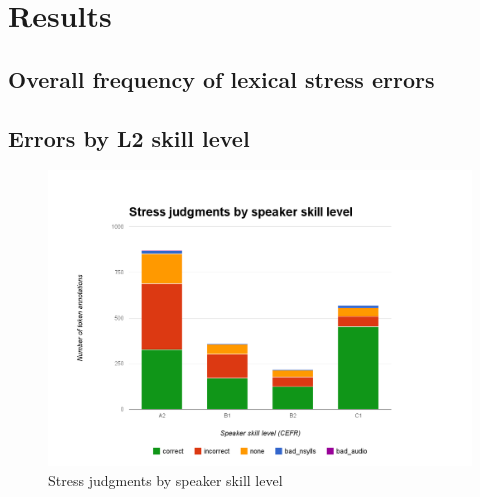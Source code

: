 
			

	\section{Results}
	\label{sec:lexstress:results}		
	
			
			
			
		\subsection{Overall frequency of lexical stress errors}
		\label{sec:results:overall}
		
		
		\subsection{Errors by L2 skill level}
		\label{sec:results:level}
		
			
			\begin{figure}[htb]
				\centering
				\includegraphics[width=\textwidth]{img/annotation/skillLevelBars}
				\caption{Stress judgments by speaker skill level }
				\label{fig:levelbars}
			\end{figure}
		
